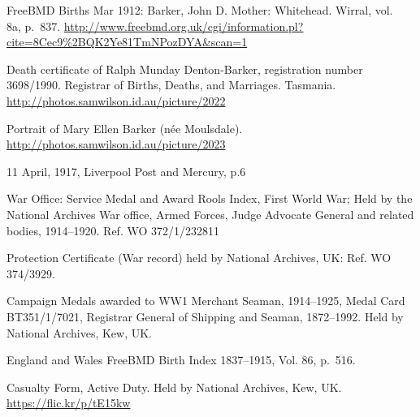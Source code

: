 \begin{thebibliography}{99}
	FreeBMD Births Mar 1912: Barker, John D. Mother: Whitehead. Wirral, vol.~ 8a, p.~837.
	\url{http://www.freebmd.org.uk/cgi/information.pl?cite=8Cec9\%2BQK2Ye81TmNPozDYA&scan=1}

	Death certificate of Ralph Munday Denton-Barker, registration number 3698/1990. Registrar of Births, Deaths, and Marriages. Tasmania.
	\url{http://photos.samwilson.id.au/picture/2022}

	Portrait of Mary Ellen Barker (n\'{e}e Moulsdale).
	\url{http://photos.samwilson.id.au/picture/2023}

	11 April, 1917, Liverpool Post and Mercury, p.6

	War Office: Service Medal and Award Rools Index, First World War; Held by the National Archives War office, 	Armed Forces, Judge Advocate General and related bodies, 1914--1920. Ref. WO 372/1/232811

	Protection Certificate (War record) held by National Archives, UK: Ref. WO 374/3929.

	Campaign Medals awarded to WW1 Merchant Seaman, 1914--1925, Medal Card BT351/1/7021, Registrar General of 
	Shipping and Seaman, 1872--1992. Held by National Archives, Kew, UK.

	England and Wales FreeBMD Birth Index 1837--1915, Vol. 86, p.~516.

	Casualty Form, Active Duty. Held by National Archives, Kew, UK. \url{https://flic.kr/p/tE15kw}

\end{thebibliography}
